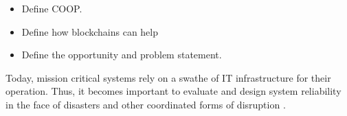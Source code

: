 \begin{itemize}
\item Define COOP.
\item Define how blockchains can help
\item Define the opportunity and problem statement.
\end{itemize}

Today, mission critical systems rely on a swathe of IT
infrastructure for their operation. Thus, it becomes important to
evaluate and design system reliability in the face of disasters and other coordinated
forms of disruption \cite{whitworth2006}.


